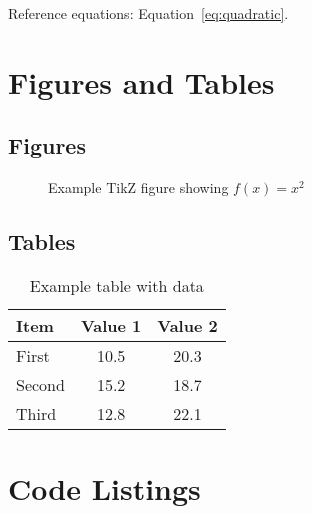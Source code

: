 \documentclass[
    language=english,
    institution=none,        %
    oneside,                 %
]{../../omnilatex}
\begin{document}
Reference equations: Equation~\eqref{eq:quadratic}.

\chapter{Figures and Tables}

\section{Figures}

\begin{figure}[htbp]
    \centering
    \caption{Example TikZ figure showing $f(x) = x^2$}
    \label{fig:example}
\end{figure}


\section{Tables}

\begin{table}[htbp]
    \centering
    \caption{Example table with data}
    \label{tab:example}
    \begin{tabular}{lcc}
        \toprule
        \textbf{Item} & \textbf{Value 1} & \textbf{Value 2} \\
        \midrule
        First         & 10.5             & 20.3             \\
        Second        & 15.2             & 18.7             \\
        Third         & 12.8             & 22.1             \\
        \bottomrule
    \end{tabular}
\end{table}

\chapter{Code Listings}
\end{document}
